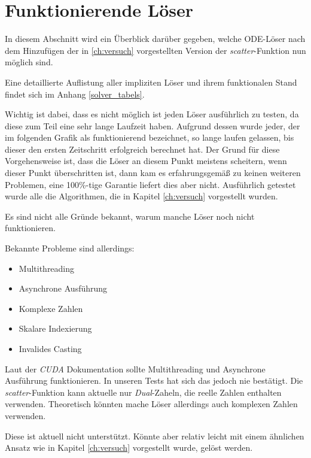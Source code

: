 \section{Funktionierende Löser}

In diesem Abschnitt wird ein Überblick darüber gegeben, welche 
ODE-Löser nach dem Hinzufügen der in \ref{ch:versuch} vorgestellten 
Version der \textit{scatter}-Funktion nun möglich sind.

Eine detaillierte Auflistung aller impliziten Löser und ihrem 
funktionalen Stand findet sich im Anhang \ref{solver_tabels}.

Wichtig ist dabei, dass es nicht möglich ist jeden Löser ausführlich zu testen,
da diese zum Teil eine sehr lange Laufzeit haben.
Aufgrund dessen wurde jeder, der im folgenden Grafik als funktionierend 
bezeichnet, so lange laufen gelassen, bis dieser den ersten Zeitschritt erfolgreich berechnet hat.
Der Grund für diese Vorgehensweise ist, dass die Löser an diesem Punkt meistens scheitern,
wenn dieser Punkt überschritten ist, dann kam es erfahrungsgemäß zu keinen 
weiteren Problemen, eine 100\%-tige Garantie liefert dies aber nicht.
Ausführlich getestet wurde alle die Algorithmen, die in Kapitel \ref{ch:versuch} vorgestellt wurden.

Es sind nicht alle Gründe bekannt, warum manche Löser noch nicht funktionieren.

Bekannte Probleme sind allerdings:

\begin{itemize}
    \item Multithreading
    \item Asynchrone Ausführung
    \item Komplexe Zahlen
    \item Skalare Indexierung
    \item Invalides Casting
\end{itemize}

Laut der \textit{CUDA} Dokumentation sollte Multithreading und Asynchrone Ausführung funktionieren.
In unseren Tests hat sich das jedoch nie bestätigt.
Die \textit{scatter}-Funktion kann aktuelle nur \textit{Dual}-Zaheln, die reelle Zahlen enthalten verwenden. Theoretisch könnten mache Löser allerdings auch komplexen Zahlen verwenden.

Diese ist aktuell nicht unterstützt.
Könnte aber relativ leicht mit einem ähnlichen Ansatz wie in Kapitel \ref{ch:versuch} vorgestellt wurde, gelöst werden.




